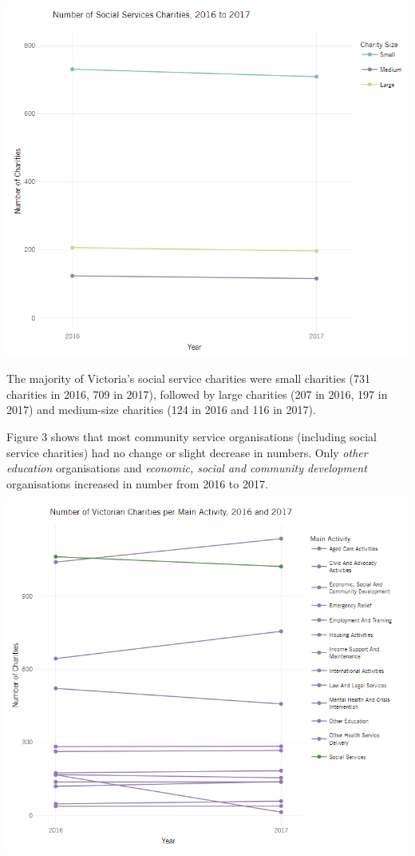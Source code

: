 \documentclass[
  11pt,
]{article}
\let\origfigure\figure
\let\endorigfigure\endfigure
\renewenvironment{figure}[1][2] {
    \expandafter\origfigure\expandafter[H]
} {
    \endorigfigure
}
\begin{document}
\begin{figure}
\centering
\includegraphics{Fig2 SocServ Charity Size.png}
\caption{Count of Social Services Charities by Charity Size}
\end{figure}

The majority of Victoria's social service charities were small charities (731 charities in 2016, 709 in 2017), followed by large charities (207 in 2016, 197 in 2017) and medium-size charities (124 in 2016 and 116 in 2017).

Figure 3 shows that most community service organisations (including social service charities) had no change or slight decrease in numbers. Only \emph{other education} organisations and \emph{economic, social and community development} organisations increased in number from 2016 to 2017.

\begin{figure}
\centering
\includegraphics{Fig3 Main Activity.png}
\caption{Count of Victorian Charities per Main Activity}
\end{figure}
\end{document}
